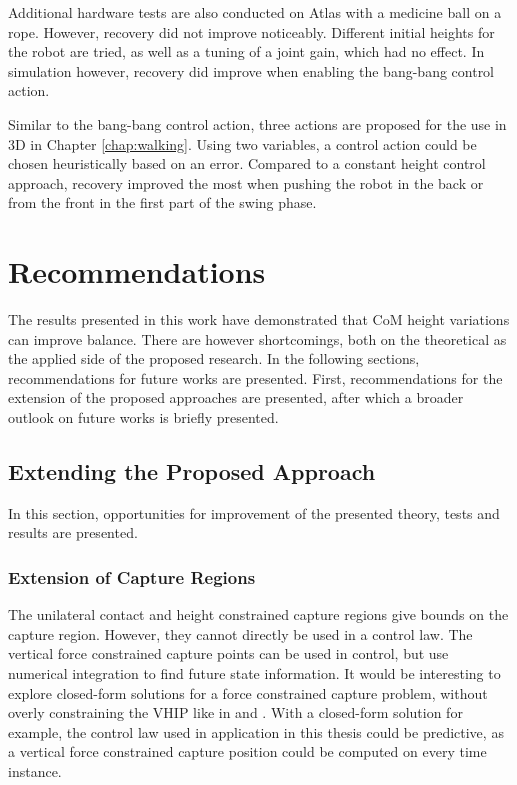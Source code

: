 Additional hardware tests are also conducted on Atlas with a medicine ball on a rope. However, recovery did not improve noticeably. Different initial heights for the robot are tried, as well as a tuning of a joint gain, which had no effect. In simulation however, recovery did improve when enabling the bang-bang control action.

Similar to the bang-bang control action, three actions are proposed for the use in \ac{3D} in Chapter \ref{chap:walking}. Using two variables, a control action could be chosen heuristically based on an error. Compared to a constant height control approach, recovery improved the most when pushing the robot in the back or from the front in the first part of the swing phase. 

\section{Recommendations}
The results presented in this work have demonstrated that \ac{CoM} height variations can improve balance. There are however shortcomings, both on the theoretical as the applied side of the proposed research. In the following sections, recommendations for future works are presented. First, recommendations for the extension of the proposed approaches are presented, after which a broader outlook on future works is briefly presented.
\subsection{Extending the Proposed Approach }
In this section, opportunities for improvement of the presented theory, tests and results are presented.
\subsubsection{Extension of Capture Regions}
The unilateral contact and height constrained capture regions give bounds on the capture region. However, they cannot directly be used in a control law. The vertical force constrained capture points can be used in control, but use numerical integration to find future state information. It would be interesting to explore closed-form solutions for a force constrained capture problem, without overly constraining the \ac{VHIP} like in \cite{pratt2007derivation} and \cite{koolen2016balance}. With a closed-form solution for example, the control law used in application in this thesis could be predictive, as a vertical force constrained capture position could be computed on every time instance.

